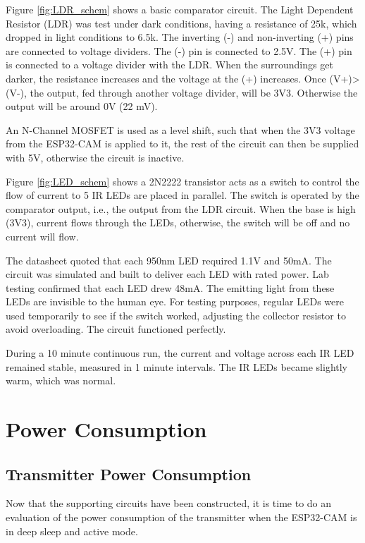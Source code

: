 \documentclass[class=report,11pt,crop=false]{standalone}
\begin{document}
Figure \ref{fig:LDR_schem} shows a basic comparator circuit. The Light Dependent Resistor (LDR) was test under dark conditions, having a resistance of 25k, which dropped in light conditions to 6.5k. The inverting (-) and non-inverting (+) pins are connected to voltage dividers. The (-) pin is connected to 2.5V. The (+) pin is connected to a voltage divider with the LDR. When the surroundings get darker, the resistance increases and the voltage at the (+) increases. Once (V+)>(V-), the output, fed through another voltage divider, will be 3V3. Otherwise the output will be around 0V (22 mV). 

An N-Channel MOSFET is used as a level shift, such that when the 3V3 voltage from the ESP32-CAM is applied to it, the rest of the circuit can then be supplied with 5V, otherwise the circuit is inactive.

Figure \ref{fig:LED_schem} shows a 2N2222 transistor acts as a switch to control the flow of current to 5 IR LEDs are placed in parallel. The switch is operated by the comparator output, i.e., the output from the LDR circuit. When the base is high (3V3), current flows through the LEDs, otherwise, the switch will be off and no current will flow. 

The datasheet quoted that each 950nm LED required 1.1V and 50mA. The circuit was simulated and built to deliver each LED with rated power. Lab testing confirmed that each LED drew 48mA. The emitting light from these LEDs are invisible to the human eye. For testing purposes, regular LEDs were used temporarily to see if the switch worked, adjusting the collector resistor to avoid overloading. The circuit functioned perfectly. 

During a 10 minute continuous run, the current and voltage across each IR LED remained stable, measured in 1 minute intervals. The IR LEDs became slightly warm, which was normal. 

\section{Power Consumption}
\subsection{Transmitter Power Consumption}
Now that the supporting circuits have been constructed, it is time to do an evaluation of the power consumption of the transmitter when the ESP32-CAM is in deep sleep and active mode. 
\end{document}

